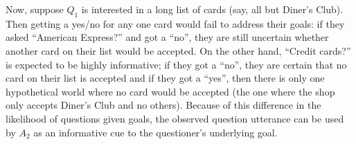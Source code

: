 \documentclass[12pt, floatsintext, jou]{apa6}
\begin{document}
Now, suppose $Q_1$ is interested in a long list of cards (say, all but Diner's Club). Then getting a yes/no for any one card would fail to address their goals: if they asked ``American Express?'' and got a ``no'', they are still uncertain whether another card on their list would be accepted. On the other hand, ``Credit cards?'' is expected to be highly informative; if they got a ``no'', they are certain that no card on their list is accepted and if they got a ``yes'', then there is only one hypothetical world where no card would be accepted (the one where the shop only accepts Diner's Club and no others). Because of this difference in the likelihood of questions given goals, the observed question utterance can be used by $A_2$ as an informative cue to the questioner's underlying goal.


\end{document}
